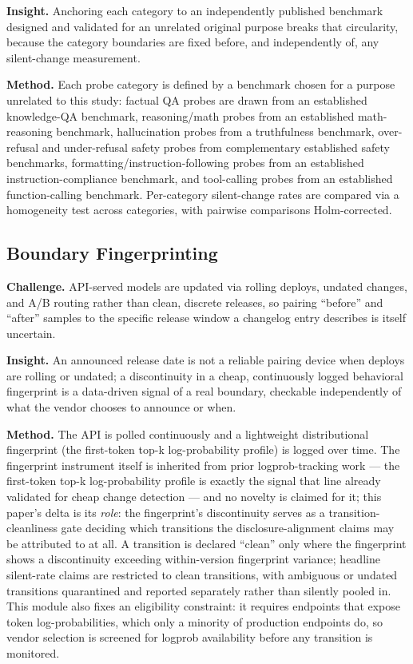 \documentclass[11pt]{article}
\begin{document}
\textbf{Insight.} Anchoring each category to an independently published benchmark designed and validated for an unrelated original purpose breaks that circularity, because the category boundaries are fixed before, and independently of, any silent-change measurement.

\textbf{Method.} Each probe category is defined by a benchmark chosen for a purpose unrelated to this study: factual QA probes are drawn from an established knowledge-QA benchmark, reasoning/math probes from an established math-reasoning benchmark, hallucination probes from a truthfulness benchmark, over-refusal and under-refusal safety probes from complementary established safety benchmarks, formatting/instruction-following probes from an established instruction-compliance benchmark, and tool-calling probes from an established function-calling benchmark. Per-category silent-change rates are compared via a homogeneity test across categories, with pairwise comparisons Holm-corrected.

\subsection{Boundary Fingerprinting}
\textbf{Challenge.} API-served models are updated via rolling deploys, undated changes, and A/B routing rather than clean, discrete releases, so pairing ``before'' and ``after'' samples to the specific release window a changelog entry describes is itself uncertain.

\textbf{Insight.} An announced release date is not a reliable pairing device when deploys are rolling or undated; a discontinuity in a cheap, continuously logged behavioral fingerprint is a data-driven signal of a real boundary, checkable independently of what the vendor chooses to announce or when.

\textbf{Method.} The API is polled continuously and a lightweight distributional fingerprint (the first-token top-k log-probability profile) is logged over time. The fingerprint instrument itself is inherited from prior logprob-tracking work \citep{LogProbTracking} --- the first-token top-k log-probability profile is exactly the signal that line already validated for cheap change detection --- and no novelty is claimed for it; this paper's delta is its \emph{role}: the fingerprint's discontinuity serves as a transition-cleanliness gate deciding which transitions the disclosure-alignment claims may be attributed to at all. A transition is declared ``clean'' only where the fingerprint shows a discontinuity exceeding within-version fingerprint variance; headline silent-rate claims are restricted to clean transitions, with ambiguous or undated transitions quarantined and reported separately rather than silently pooled in. This module also fixes an eligibility constraint: it requires endpoints that expose token log-probabilities, which only a minority of production endpoints do, so vendor selection is screened for logprob availability before any transition is monitored.
\end{document}

